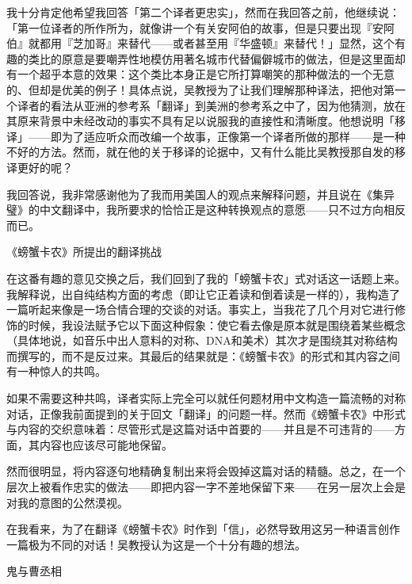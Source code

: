 \documentclass[
  12pt,
  twoside,
  openright,
  oldfontcommands,
]{memoir}
\begin{document}
我十分肯定他希望我回答「第二个译者更忠实」，然而在我回答之前，他继续说：「第一位译者的所作所为，就像讲一个有关安阿伯的故事，但是只要出现『安阿伯』就都用『芝加哥』来替代------或者甚至用『华盛顿』来替代！」显然，这个有趣的类比的原意是要嘲弄性地模仿用著名城市代替偏僻城市的做法，但是这里面却有一个超乎本意的效果：这个类比本身正是它所打算嘲笑的那种做法的一个无意的、但却是优美的例子！具体点说，吴教授为了让我们理解那种译法，把他对第一个译者的看法从亚洲的参考系「翻译」到美洲的参考系之中了，因为他猜测，放在其原来背景中未经改动的事实不具有足以说服我的直接性和清晰度。他想说明「移译」------即为了适应听众而改编一个故事，正像第一个译者所做的那样------是一种不好的方法。然而，就在他的关于移译的论据中，又有什么能比吴教授那自发的移译更好的呢？

我回答说，我非常感谢他为了我而用美国人的观点来解释问题，并且说在《集异璧》的中文翻译中，我所要求的恰恰正是这种转换观点的意愿------只不过方向相反而已。

{《螃蟹卡}农》所提出的翻译挑战

在这番有趣的意见交换之后，我们回到了我的「螃蟹卡农」式对话这一话题上来。我解释说，出自纯结构方面的考虑（即让它正着读和倒着读是一样的），我构造了一篇听起来像是一场合情合理的交谈的对话。事实上，当我花了几个月对它进行修饰的时候，我设法赋予它以下面这种假象：使它看去像是原本就是围绕着某些概念（具体地说，如音乐中出人意料的对称、DNA和美术）其次才是围绕其对称结构而撰写的，而不是反过来。其最后的结果就是：《螃蟹卡农》的形式和其内容之间有一种惊人的共鸣。

如果不需要这种共鸣，译者实际上完全可以就任何题材用中文构造一篇流畅的对称对话，正像我前面提到的关于回文「翻译」的问题一样。然而《螃蟹卡农》中形式与内容的交织意味着：尽管形式是这篇对话中首要的------并且是不可违背的------方面，其内容也应该尽可能地保留。

然而很明显，将内容逐句地精确复制出来将会毁掉这篇对话的精髓。总之，在一个层次上被看作忠实的做法------即把内容一字不差地保留下来------在另一层次上会是对我的意图的公然漠视。

在我看来，为了在翻译《螃蟹卡农》时作到「信」，必然导致用这另一种语言创作一篇极为不同的对话！吴教授认为这是一个十分有趣的想法。

{鬼与曹丞}相
\end{document}
